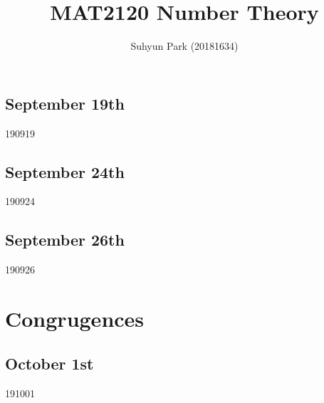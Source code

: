 



\title{MAT2120 Number Theory}
\author{Suhyun Park (20181634)}

\subsection{September 19th}
{190919}

\subsection{September 24th}
{190924}

\subsection{September 26th}
{190926}

\section{Congrugences}
\subsection{October 1st}
{191001}


